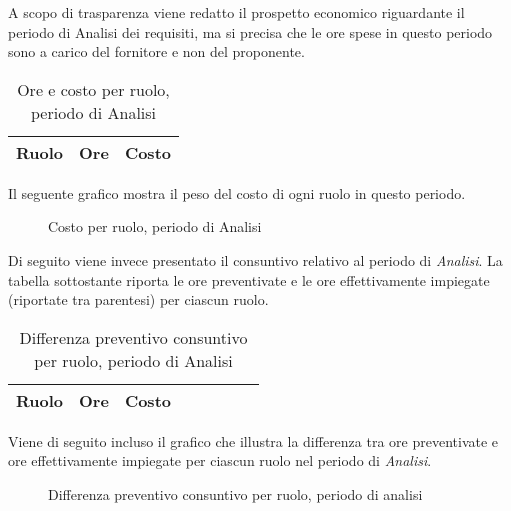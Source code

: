 	A scopo di trasparenza viene redatto il prospetto economico riguardante il periodo di Analisi dei requisiti, ma si precisa che le ore spese in questo periodo sono a carico del fornitore e non del proponente.

	\begin{table}[H]
	\centering
	\begin{tabular}{ l c c }
		\textbf{Ruolo} & \textbf{Ore} & \textbf{Costo} \\
		\hline
		
	\end{tabular}
	\caption{Ore e costo per ruolo, periodo di Analisi}
	\end{table}

	Il seguente grafico mostra il peso del costo di ogni ruolo in questo periodo.

	\begin{figure}[H]
	\begin{tikzpicture}
		
	\end{tikzpicture}
	\caption{Costo per ruolo, periodo di Analisi}
	\end{figure}

	Di seguito viene invece presentato il consuntivo relativo al periodo di \textit{Analisi}. La tabella sottostante riporta le ore preventivate e le ore effettivamente impiegate (riportate tra parentesi) per ciascun ruolo.

	\begin{table}[H]
	\centering
	\begin{tabular}{lccccccc}
	\toprule
	    \textbf{Ruolo}  & \textbf{Ore} & \textbf{Costo} \\
	    \midrule
	    
	    \bottomrule
	\end{tabular}
	\caption{Differenza preventivo consuntivo per ruolo, periodo di Analisi}
	\end{table}

	Viene di seguito incluso il grafico che illustra la differenza tra ore preventivate e ore effettivamente impiegate per ciascun ruolo nel periodo di \textit{Analisi}.

	\begin{figure}[H]
	\centering
	\caption{Differenza preventivo consuntivo per ruolo, periodo di analisi}
	\end{figure}


